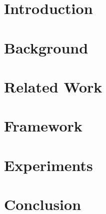\documentclass[12pt,msthesis]{withesis}
\begin{document}




\chapter{Introduction}

\chapter{Background}

\chapter{Related Work}

\chapter{Framework}

\chapter{Experiments}

\chapter{Conclusion}


%
%
%


\end{document}

